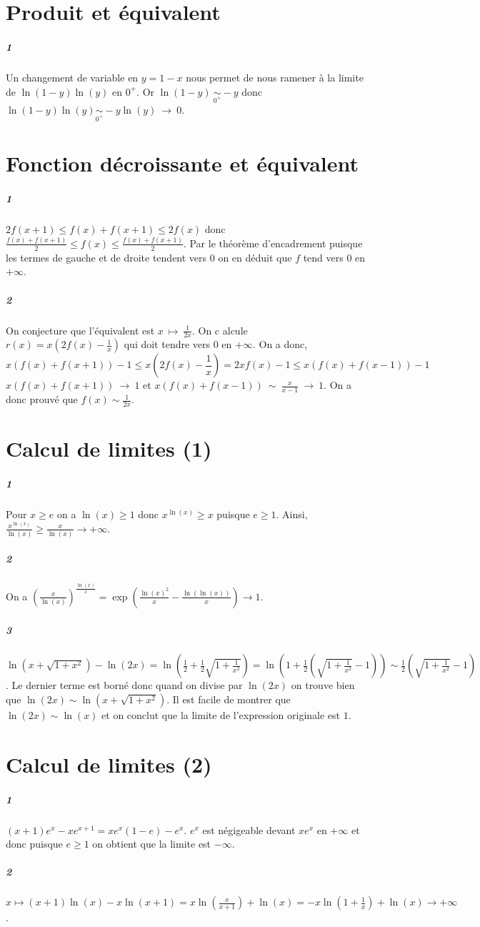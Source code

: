 \documentclass[10pt,a4paper]{article}
\begin{document}
\section{Produit et équivalent}
\subparagraph{1}Un changement de variable en $y = 1-x$ nous permet de nous ramener à la limite de $\ln(1-y) \ln(y)$ en $0^+$. Or $\ln(1-y) \ \underset{0^+}{\sim} -y$ donc ${\ln(1-y) \ln(y) \underset{0^+}{\sim} -y\ln(y) \ \rightarrow \ 0}$.

\section{Fonction décroissante et équivalent}
\subparagraph{1} $2f(x+1) \le f(x) + f(x+1) \le 2f(x)$ donc $\frac{f(x)+f(x+1)}{2} \le f(x) \le \frac{f(x) + f(x+1)}{2}$. Par le théorème d'encadrement puisque les termes de gauche et de droite tendent vers $0$ on en déduit que $f$ tend vers $0$ en $+\infty$.
\subparagraph{2}On conjecture que l'équivalent est $x \ \mapsto \ \frac{1}{2x}$. On c	alcule ${r(x) = x(2f(x) - \frac{1}{x})}$ qui doit tendre vers $0$ en $+\infty$. On a donc,
\[
x(f(x) + f(x+1)) - 1 \le x(2f(x) - \frac{1}{x}) = 2xf(x) - 1 \le x(f(x) + f(x-1)) - 1
\]
$x(f(x) + f(x+1)) \ \rightarrow \ 1$ et $x(f(x) + f(x-1)) \ \sim \ \frac{x}{x-1} \ \rightarrow \ 1$. On a donc prouvé que $f(x) \sim \frac{1}{2x}$.
\section{Calcul de limites (1)}
\subparagraph{1}Pour $x \ge e$ on a $\ln(x) \ge 1$ donc $x^{\ln(x)} \ge x$ puisque $e \ge 1$. Ainsi, ${\frac{x^{\ln(x)}}{\ln(x)}} \ge \frac{x}{\ln(x)} \rightarrow +\infty$. 
\subparagraph{2}On a ${ \left( \frac{x}{\ln(x)} \right)^{\frac{\ln(x)}{x}} = \exp\left( \frac{\ln(x)^2}{x} - \frac{\ln(\ln(x)) }{x}\right)} \rightarrow 1$.
\subparagraph{3} ${\ln(x + \sqrt{1+x^2}) - \ln(2x) = \ln(\frac{1}{2}+ \frac{1}{2} \sqrt{1 + \frac{1}{x^2}}) = \ln \left( 1+ \frac{1}{2}(\sqrt{1 + \frac{1}{x^2}}-1) \right) \sim \frac{1}{2}(\sqrt{1 + \frac{1}{x^2}}-1) }$. Le dernier terme est borné donc quand on divise par $\ln(2x)$ on trouve bien que $\ln(2x) \sim \ln(x + \sqrt{1+x^2})$. Il est facile de montrer que $\ln(2x) \sim \ln(x)$ et on conclut que la limite de l'expression originale est $1$.

\section{Calcul de limites (2)}
\subparagraph{1}$(x+1)e^x-xe^{x+1} = xe^x(1-e) - e^x$. $e^x$ est négigeable devant $xe^x$ en $+\infty$ et donc puisque $e\ge 1$ on obtient que la limite est $-\infty$.
\subparagraph{2}$x \mapsto (x+1)\ln(x)-x\ln(x+1) = x \ln(\frac{x}{x+1}) + \ln(x) = -x\ln(1 + \frac{1}{x}) + \ln(x) \rightarrow +\infty$.
\end{document}
